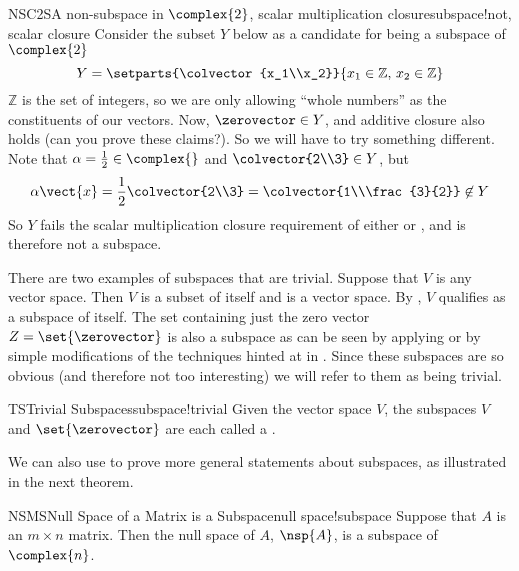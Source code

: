 %
%
\begin{example}{NSC2S}{A non-subspace in $\complex{2}$, scalar multiplication closure}{subspace!not, scalar closure}
Consider the subset $Y$ below as a candidate for being a subspace of $\complex{2}$
%
\begin{equation*}
Y=\setparts{\colvector{x_1\\x_2}}{x_1\in{\mathbb Z},\,x_2\in{\mathbb Z}}
\end{equation*}
%
${\mathbb Z}$ is the set of integers, so we are only allowing ``whole numbers'' as the constituents of our vectors.  Now, $\zerovector\in Y$, and additive closure also holds (can you prove these claims?).  So we will have to try something different.  Note that $\alpha = \frac{1}{2}\in\complex{\null}$ and $\colvector{2\\3}\in Y$, but
\begin{equation*}
\alpha\vect{x}=\frac{1}{2}\colvector{2\\3}=\colvector{1\\\frac{3}{2}}\not\in Y
\end{equation*}
So $Y$ fails the scalar multiplication closure requirement of either  or , and is therefore not a subspace.
\end{example}
%
There are two examples of subspaces that are trivial.  Suppose that $V$ is any vector space.  Then $V$ is a subset of itself and is a vector space.  By , $V$ qualifies as a subspace of itself.  The set containing just the zero vector $Z=\set{\zerovector}$ is also a subspace as can be seen by applying  or by simple modifications of the techniques hinted at in .  Since these subspaces are so obvious (and therefore not too interesting) we will refer to them as being trivial.
%
\begin{definition}{TS}{Trivial Subspaces}{subspace!trivial}
Given the vector space $V$, the subspaces $V$ and $\set{\zerovector}$ are each called a .
\end{definition}
%
We can also use  to prove more general statements about subspaces, as illustrated in the next theorem.
%
\begin{theorem}{NSMS}{Null Space of a Matrix is a Subspace}{null space!subspace}
Suppose that $A$ is an $m\times n$ matrix.  Then the null space of $A$, $\nsp{A}$, is a subspace of $\complex{n}$.
\end{theorem}
%
